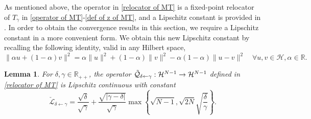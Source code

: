 \documentclass[a4paper,12pt]{article}
\newtheorem{lemma}[theorem]{Lemma}
\begin{document}
As mentioned above, the operator in \eqref{relocator of MT} is a fixed-point relocator of $T_\gamma$ in \eqref{operator of MT}-\eqref{def of z of MT}, and a Lipschitz constant is provided in \cite[Proposition 5.5]{atenas2025relocated}. In order to obtain the convergence results in this section, we require a Lipschitz constant in a more convenient form. We obtain this new Lipschitz constant by recalling the following identity, valid in any Hilbert space, 
\begin{equation} \label{eq:identity}
    \|\alpha u+(1-\alpha)v\|^2 = \alpha\|u\|^2+(1-\alpha)\|v\|^2-\alpha(1-\alpha)\|u-v\|^2\quad\forall u,v \in \mathcal{H}, \alpha \in \mathbb{R}.
\end{equation} 
\begin{lemma} \label{l:FPR-Lip}
    For $\delta,\gamma \in \mathbb{R}_{++}$, the operator $\mathcal{\Tilde{Q}}_{\delta\gets\gamma}: \mathcal{H}^{N-1} \to \mathcal{H}^{N-1}$ defined in \eqref{relocator of MT} is Lipschitz continuous with constant 
    \begin{equation*}
        \check{\mathcal{L}}_{\delta\gets\gamma} = \frac{\sqrt{\delta}}{\sqrt{\gamma}}+\frac{\sqrt{|\gamma-\delta|}}{\sqrt{\gamma}}\max\left\{\sqrt{N-1},  \sqrt{2N}\sqrt{\frac{\delta}{\gamma}}\right\}.
    \end{equation*}%
\end{lemma}
\end{document}
